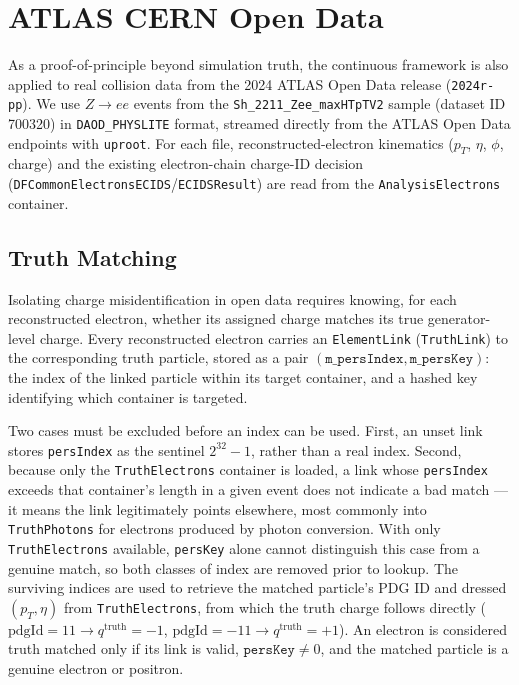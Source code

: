 \section{ATLAS CERN Open Data}
\label{sec:Opendata}

As a proof-of-principle beyond simulation truth, the continuous framework is also applied to real collision data from the 2024 ATLAS Open Data release (\texttt{2024r-pp}). We use \(Z\rightarrow ee\) events from the \texttt{Sh\_2211\_Zee\_maxHTpTV2} sample (dataset ID 700320) in \texttt{DAOD\_PHYSLITE} format, streamed directly from the ATLAS Open Data endpoints with \texttt{uproot}. For each file, reconstructed-electron kinematics (\(p_T\), \(\eta\), \(\phi\), charge) and the existing electron-chain charge-ID decision (\texttt{DFCommonElectronsECIDS}/\texttt{ECIDSResult}) are read from the \texttt{AnalysisElectrons} container.

\subsection{Truth Matching}

Isolating charge misidentification in open data requires knowing, for each reconstructed electron, whether its assigned charge matches its true generator-level charge. Every reconstructed electron carries an \texttt{ElementLink} (\texttt{TruthLink}) to the corresponding truth particle, stored as a pair \((\texttt{m\_persIndex}, \texttt{m\_persKey})\): the index of the linked particle within its target container, and a hashed key identifying which container is targeted.

Two cases must be excluded before an index can be used. First, an unset link stores \texttt{persIndex} as the sentinel \(2^{32}-1\), rather than a real index. Second, because only the \texttt{TruthElectrons} container is loaded, a link whose \texttt{persIndex} exceeds that container's length in a given event does not indicate a bad match — it means the link legitimately points elsewhere, most commonly into \texttt{TruthPhotons} for electrons produced by photon conversion. With only \texttt{TruthElectrons} available, \texttt{persKey} alone cannot distinguish this case from a genuine match, so both classes of index are removed prior to lookup. The surviving indices are used to retrieve the matched particle's PDG ID and dressed \((p_T,\eta)\) from \texttt{TruthElectrons}, from which the truth charge follows directly (\(\mathrm{pdgId}=11\rightarrow q^{\mathrm{truth}}=-1\), \(\mathrm{pdgId}=-11\rightarrow q^{\mathrm{truth}}=+1\)). An electron is considered truth matched only if its link is valid, \(\texttt{persKey}\neq 0\), and the matched particle is a genuine electron or positron.

